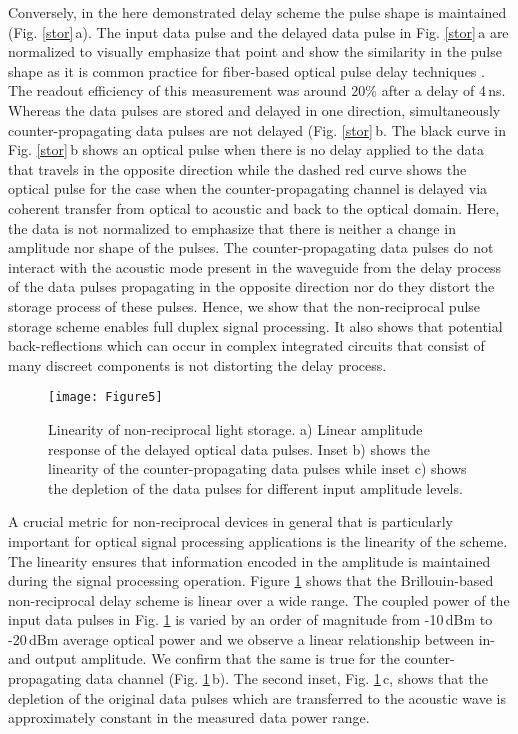 \documentclass[superscriptaddress, nofootinbib, twocolumn, amsmath,amssymb, aps, pra, notitlepage, longbibliography]{revtex4-1}
\begin{document}
Conversely, in the here demonstrated delay scheme the pulse shape is maintained (Fig. \ref{stor}\,a). The input data pulse and the delayed data pulse in Fig. \ref{stor}\,a are normalized to visually emphasize that point and show the similarity in the pulse shape as it is common practice for fiber-based optical pulse delay techniques \cite{Okawachi2005,Song2005,Song2009,Preussler2009,Chin2012,Merklein2018}. The readout efficiency of this measurement was around 20\% after a delay of 4\,ns. \newline
Whereas the data pulses are stored and delayed in one direction, simultaneously counter-propagating data pulses are not delayed (Fig. \ref{stor}\,b. The black curve in Fig. \ref{stor}\,b shows an optical pulse when there is no delay applied to the data that travels in the opposite direction while the dashed red curve shows the optical pulse for the case when the counter-propagating channel is delayed via coherent transfer from optical to acoustic and back to the optical domain. Here, the data is not normalized to emphasize that there is neither a change in amplitude nor shape of the pulses. The counter-propagating data pulses do not interact with the acoustic mode present in the waveguide from the delay process of the data pulses propagating in the opposite direction nor do they distort the storage process of these pulses. Hence, we show that the non-reciprocal pulse storage scheme enables full duplex signal processing. It also shows that potential back-reflections which can occur in complex integrated circuits that consist of many discreet components is not distorting the delay process. \newline
%
\begin{figure}[t]
\begin{center}
  \texttt{[image: Figure5]}
  \caption{Linearity of non-reciprocal light storage. a) Linear amplitude response of the delayed optical data pulses. Inset b) shows the linearity of the counter-propagating data pulses while inset c) shows the depletion of the data pulses for different input amplitude levels.}
\label{lin}
\end{center}
\end{figure}
%
A crucial metric for non-reciprocal devices in general that is particularly important for optical signal processing applications is the linearity of the scheme. The linearity ensures that information encoded in the amplitude is maintained during the signal processing operation. Figure \ref{lin} shows that the Brillouin-based non-reciprocal delay scheme is linear over a wide range. The coupled power of the input data pulses in Fig. \ref{lin} is varied by an order of magnitude from -10\,dBm to -20\,dBm average optical power and we observe a linear relationship between in-and output amplitude. We confirm that the same is true for the counter-propagating data channel (Fig. \ref{lin}\,b). The second inset, Fig. \ref{lin}\,c, shows that the depletion of the original data pulses which are transferred to the acoustic wave is approximately constant in the measured data power range. \newline
%
\end{document}
